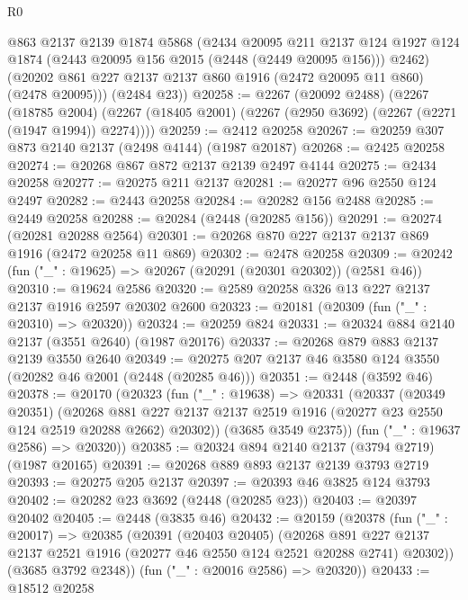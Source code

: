 \begin{lexlean}{R0}
\begin{coremodule}
        @863
        @2137
        @2139
        @1874
        @5868
        (@2434
          @20095
          @211
          @2137
          @124
          @1927
          @124
          @1874
          (@2443 @20095 @156 @2015 (@2448 (@2449 @20095 @156)))
          @2462)
        (@20202 @861 @227 @2137 @2137 @860 @1916 (@2472 @20095 @11 @860) (@2478 @20095)))
      (@2484 @23))
@20258 := @2267
    (@20092 @2488)
    (@2267
      (@18785 @2004)
      (@2267 (@18405 @2001) (@2267 (@2950 @3692) (@2267 (@2271 (@1947 @1994)) @2274))))
@20259 := @2412 @20258
@20267 := @20259 @307 @873 @2140 @2137 (@2498 @4144) (@1987 @20187)
@20268 := @2425 @20258
@20274 := @20268 @867 @872 @2137 @2139 @2497 @4144
@20275 := @2434 @20258
@20277 := @20275 @211 @2137
@20281 := @20277 @96 @2550 @124 @2497
@20282 := @2443 @20258
@20284 := @20282 @156 @2488
@20285 := @2449 @20258
@20288 := @20284 (@2448 (@20285 @156))
@20291 := @20274 (@20281 @20288 @2564)
@20301 := @20268 @870 @227 @2137 @2137 @869 @1916 (@2472 @20258 @11 @869)
@20302 := @2478 @20258
@20309 := @20242 (fun ("_" : @19625) => @20267 (@20291 (@20301 @20302)) (@2581 @46))
@20310 := @19624 @2586
@20320 := @2589 @20258 @326 @13 @227 @2137 @2137 @1916 @2597 @20302 @2600
@20323 := @20181 (@20309 (fun ("_" : @20310) => @20320))
@20324 := @20259 @824
@20331 := @20324 @884 @2140 @2137 (@3551 @2640) (@1987 @20176)
@20337 := @20268 @879 @883 @2137 @2139 @3550 @2640
@20349 := @20275 @207 @2137 @46 @3580 @124 @3550 (@20282 @46 @2001 (@2448 (@20285 @46)))
@20351 := @2448 (@3592 @46)
@20378 := @20170
    (@20323
      (fun ("_" : @19638) =>
      @20331
        (@20337
          (@20349 @20351)
          (@20268
            @881
            @227
            @2137
            @2137
            @2519
            @1916
            (@20277 @23 @2550 @124 @2519 @20288 @2662)
            @20302))
        (@3685 @3549 @2375))
      (fun ("_" : @19637 @2586) => @20320))
@20385 := @20324 @894 @2140 @2137 (@3794 @2719) (@1987 @20165)
@20391 := @20268 @889 @893 @2137 @2139 @3793 @2719
@20393 := @20275 @205 @2137
@20397 := @20393 @46 @3825 @124 @3793
@20402 := @20282 @23 @3692 (@2448 (@20285 @23))
@20403 := @20397 @20402
@20405 := @2448 (@3835 @46)
@20432 := @20159
    (@20378
      (fun ("_" : @20017) =>
      @20385
        (@20391
          (@20403 @20405)
          (@20268
            @891
            @227
            @2137
            @2137
            @2521
            @1916
            (@20277 @46 @2550 @124 @2521 @20288 @2741)
            @20302))
        (@3685 @3792 @2348))
      (fun ("_" : @20016 @2586) => @20320))
@20433 := @18512 @20258

\end{coremodule}
\end{lexlean}
